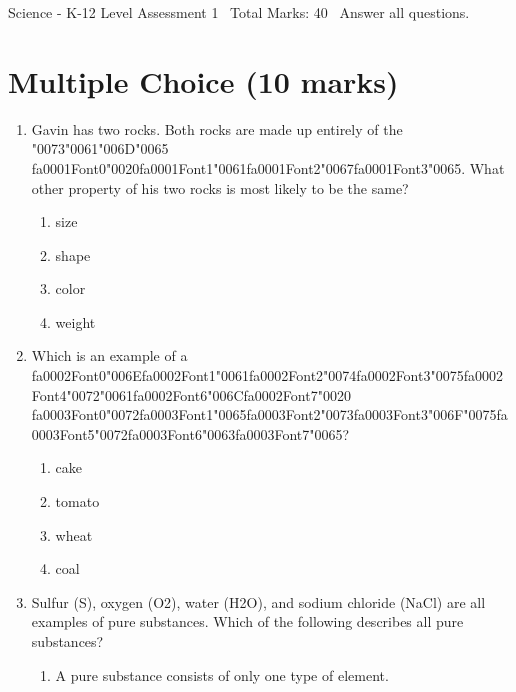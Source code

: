 \documentclass[12pt]{article}
\begin{document}
\begin{center}
Science - K-12 Level Assessment 1 \
Total Marks: 40 \
Answer all questions.
\end{center}

\section*{Multiple Choice (10 marks)}
\begin{enumerate}[label=\arabic*.]
\item Gavin has two rocks. Both rocks are made up entirely of the {\char"0073}{\char"0061}{\char"006D}{\char"0065} {\csname fa0001Font0\endcsname\char"0020}{\csname fa0001Font1\endcsname\char"0061}{\csname fa0001Font2\endcsname\char"0067}{\csname fa0001Font3\endcsname\char"0065}. What other
property of his two rocks is most likely to be the same?
\begin{enumerate}[label=(\alph*)]
    \item size
    \item shape
    \item color
    \item weight
\end{enumerate}
\item Which is an example of a {\csname fa0002Font0\endcsname\char"006E}{\csname fa0002Font1\endcsname\char"0061}{\csname fa0002Font2\endcsname\char"0074}{\csname fa0002Font3\endcsname\char"0075}{\csname fa0002Font4\endcsname\char"0072}{\char"0061}{\csname fa0002Font6\endcsname\char"006C}{\csname fa0002Font7\endcsname\char"0020} {\csname fa0003Font0\endcsname\char"0072}{\csname fa0003Font1\endcsname\char"0065}{\csname fa0003Font2\endcsname\char"0073}{\csname fa0003Font3\endcsname\char"006F}{\char"0075}{\csname fa0003Font5\endcsname\char"0072}{\csname fa0003Font6\endcsname\char"0063}{\csname fa0003Font7\endcsname\char"0065}?
\begin{enumerate}[label=(\alph*)]
    \item cake
    \item tomato
    \item wheat
    \item coal
\end{enumerate}
\item Sulfur (S), oxygen (O2), water (H2O), and sodium chloride (NaCl) are all examples of pure
substances. Which of the following describes all pure substances?
\begin{enumerate}[label=(\alph*)]
    \item A pure substance consists of only one type of element.

\end{enumerate}
\end{enumerate}
\end{document}
